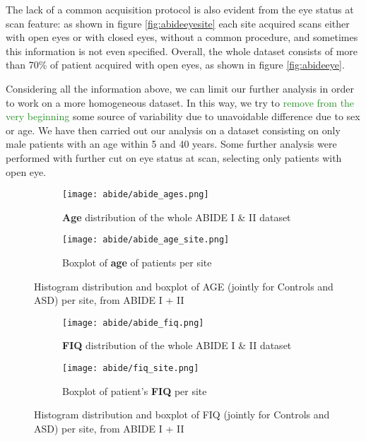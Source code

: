\documentclass[11pt]{report}
\begin{document}
The lack of a common acquisition protocol is also evident from the eye status at scan feature: as shown in figure \ref{fig:abideeyesite} each site acquired scans either with open eyes or with closed eyes, without a common procedure, and sometimes this information is not even specified.
Overall, the whole dataset consists of more than 70\% of patient acquired with open eyes, as shown in figure \ref{fig:abideeye}.

Considering all the information above, we can limit our further analysis in order to work on a more homogeneous dataset. In this way, we try to \textcolor{ForestGreen}{remove from the very beginning} some source of variability due to unavoidable difference due to sex or age.
We have then carried out our analysis on a dataset consisting on only male patients with an age within 5 and 40 years. Some further analysis were performed with further cut on eye status at scan, selecting only patients with open eye.




\begin{figure}
\centering
\begin{subfigure}{0.5\textwidth}
\texttt{[image: abide/abide\_ages.png]}
\caption{\textbf{Age} distribution of the whole ABIDE I \& II dataset}
\label{fig:abideages}
\end{subfigure}

\begin{subfigure}{0.9\textwidth}
\texttt{[image: abide/abide\_age\_site.png]}
\caption{Boxplot of \textbf{age} of patients per site}
\label{fig:abide_age_site}
\end{subfigure}
\caption{Histogram distribution and boxplot of AGE (jointly for Controls and ASD) per site, from ABIDE I + II}
 
\end{figure}






\begin{figure}
\centering
\begin{subfigure}{0.5\textwidth}
\texttt{[image: abide/abide\_fiq.png]}
\caption{\textbf{FIQ} distribution of the whole ABIDE I \& II dataset}
\label{fig:abidefiq}
\end{subfigure}
\begin{subfigure}{0.9\textwidth}
\texttt{[image: abide/fiq\_site.png]}
\caption{Boxplot of patient's \textbf{FIQ} per site}
\label{fig:abide_fiq_site}
\end{subfigure}
\caption{Histogram distribution and boxplot of FIQ (jointly for Controls and ASD) per site, from ABIDE I + II}
 
\end{figure}
\end{document}
